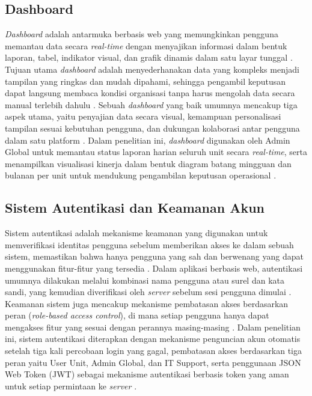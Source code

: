 \subsection{Dashboard} \label{II.Dashboard}
\textit{Dashboard} adalah antarmuka berbasis web yang memungkinkan pengguna memantau data secara \textit{real-time} dengan menyajikan informasi dalam bentuk laporan, tabel, indikator visual, dan grafik dinamis dalam satu layar tunggal \cite{armansah2025dashboard}. Tujuan utama \textit{dashboard} adalah menyederhanakan data yang kompleks menjadi tampilan yang ringkas dan mudah dipahami, sehingga pengambil keputusan dapat langsung membaca kondisi organisasi tanpa harus mengolah data secara manual terlebih dahulu \cite{armansah2025dashboard}. Sebuah \textit{dashboard} yang baik umumnya mencakup tiga aspek utama, yaitu penyajian data secara visual, kemampuan personalisasi tampilan sesuai kebutuhan pengguna, dan dukungan kolaborasi antar pengguna dalam satu platform \cite{mantik2022dashboard}. Dalam penelitian ini, \textit{dashboard} digunakan oleh Admin Global untuk memantau status laporan harian seluruh unit secara \textit{real-time}, serta menampilkan visualisasi kinerja dalam bentuk diagram batang mingguan dan bulanan per unit untuk mendukung pengambilan keputusan operasional \cite{lutfiyah2025dashboard}. \par

\subsection{Sistem Autentikasi dan Keamanan Akun} \label{II.Autentikasi}
Sistem autentikasi adalah mekanisme keamanan yang digunakan untuk memverifikasi identitas pengguna sebelum memberikan akses ke dalam sebuah sistem, memastikan bahwa hanya pengguna yang sah dan berwenang yang dapat menggunakan fitur-fitur yang tersedia \cite{kirana2025jwt}. Dalam aplikasi berbasis web, autentikasi umumnya dilakukan melalui kombinasi nama pengguna atau surel dan kata sandi, yang kemudian diverifikasi oleh \textit{server} sebelum sesi pengguna dimulai \cite{kirana2025jwt}. Keamanan sistem juga mencakup mekanisme pembatasan akses berdasarkan peran (\textit{role-based access control}), di mana setiap pengguna hanya dapat mengakses fitur yang sesuai dengan perannya masing-masing \cite{kirana2025jwt}. Dalam penelitian ini, sistem autentikasi diterapkan dengan mekanisme penguncian akun otomatis setelah tiga kali percobaan login yang gagal, pembatasan akses berdasarkan tiga peran yaitu User Unit, Admin Global, dan IT Support, serta penggunaan JSON Web Token (JWT) sebagai mekanisme autentikasi berbasis token yang aman untuk setiap permintaan ke \textit{server} \cite{miftahul2024jwt}. \par

